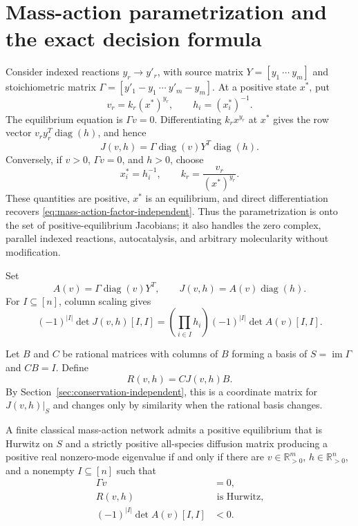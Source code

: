 \section{Mass-action parametrization and the exact decision formula}
\label{sec:semialgebraic-independent}

Consider indexed reactions $y_r\to y'_r$, with source matrix
$Y=[y_1\ \cdots\ y_m]$ and stoichiometric matrix
$\Gamma=[y'_1-y_1\ \cdots\ y'_m-y_m]$.  At a positive state $x^*$, put
\[
 v_r=k_r(x^*)^{y_r},\qquad h_i=(x_i^*)^{-1}.
\]
The equilibrium equation is $\Gamma v=0$.  Differentiating
$k_rx^{y_r}$ at $x^*$ gives the row vector
$v_ry_r^T\operatorname{diag}(h)$, and hence
\begin{equation}
 J(v,h)=\Gamma\operatorname{diag}(v)Y^T\operatorname{diag}(h).
 \label{eq:mass-action-factor-independent}
\end{equation}
Conversely, if $v>0$, $\Gamma v=0$, and $h>0$, choose
\[
 x_i^*=h_i^{-1},\qquad
 k_r=\frac{v_r}{(x^*)^{y_r}}.
\]
These quantities are positive, $x^*$ is an equilibrium, and direct
differentiation recovers \eqref{eq:mass-action-factor-independent}.  Thus the
parametrization is onto the set of positive-equilibrium Jacobians; it also
handles the zero complex, parallel indexed reactions, autocatalysis, and
arbitrary molecularity without modification.

Set
\[
 A(v)=\Gamma\operatorname{diag}(v)Y^T,
 \qquad J(v,h)=A(v)\operatorname{diag}(h).
\]
For $I\subseteq[n]$, column scaling gives
\begin{equation}
 (-1)^{|I|}\det J(v,h)[I,I]
 =\left(\prod_{i\in I}h_i\right)
   (-1)^{|I|}\det A(v)[I,I].
 \label{eq:minor-scale-independent}
\end{equation}

Let $B$ and $C$ be rational matrices with columns of $B$ forming a basis of
$S=\operatorname{im}\Gamma$ and $CB=I$.  Define
\[
 R(v,h)=CJ(v,h)B.
\]
By Section~\ref{sec:conservation-independent}, this is a coordinate matrix for
$J(v,h)|_S$ and changes only by similarity when the rational basis changes.

\begin{theorem}
\label{thm:semialgebraic-independent}
A finite classical mass-action network admits a positive equilibrium that is
Hurwitz on $S$ and a strictly positive all-species diffusion matrix producing
a positive real nonzero-mode eigenvalue if and only if there are
$v\in\mathbb R_{>0}^m$, $h\in\mathbb R_{>0}^n$, and a nonempty
$I\subseteq[n]$ such that
\begin{align}
 \Gamma v&=0,\label{eq:char-flux-independent}\\
 R(v,h)&\text{ is Hurwitz},\label{eq:char-hurwitz-independent}\\
 (-1)^{|I|}\det A(v)[I,I]&<0.
 \label{eq:char-minor-independent}
\end{align}
\end{theorem}

